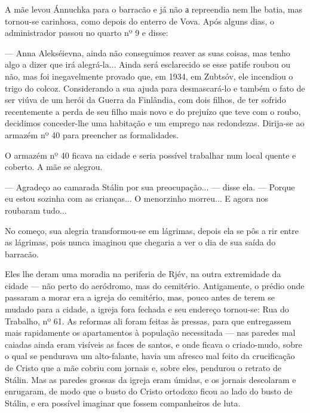 A mãe levou Ánnuchka para o barracão e já não а repreendia nem lhe
batia, mas tornou-se carinhosa, como depois do enterro de Vova. Após
alguns dias, o administrador passou no quarto nº 9 e disse:

--- Anna Alekséievna, ainda não conseguimos reaver as suas coisas, mas
tenho algo a dizer que irá alegrá-la... Ainda será esclarecido se esse
patife roubou ou não, mas foi inegavelmente provado que, em 1934, em
Zubtsóv, ele incendiou o trigo do colcoz. Considerando a sua ajuda para
desmascará-lo e também o fato de ser viúva de um herói da Guerra da
Finlândia, com dois filhos, de ter sofrido recentemente a perda de seu
filho mais novo e do prejuízo que teve com o roubo, decidimos
conceder-lhe uma habitação e um emprego nas redondezas. Dirija-se ao
armazém nº 40 para preencher as formalidades.

O armazém nº 40 ficava na cidade e seria possível trabalhar num local
quente e coberto. A mãe se alegrou.

--- Agradeço ao camarada Stálin por sua preocupação... --- disse ela.
--- Porque eu estou sozinha com as crianças... O menorzinho morreu... E
agora nos roubaram tudo...

No começo, sua alegria transformou-se em lágrimas, depois ela se pôs a
rir entre as lágrimas, pois nunca imaginou que chegaria a ver o dia de
sua saída do barracão.

Eles lhe deram uma moradia na periferia de Rjév, na outra extremidade da
cidade --- não perto do aeródromo, mas do cemitério. Antigamente, o
prédio onde passaram a morar era a igreja do cemitério, mas, pouco antes
de terem se mudado para a cidade, a igreja fora fechada e seu endereço
tornou-se: Rua do Trabalho, nº 61. As reformas ali foram feitas às
pressas, para que entregassem mais rapidamente os apartamentos à
população necessitada --- nas paredes mal caiadas ainda eram visíveis as
faces de santos, e onde ficava o criado-mudo, sobre o qual se pendurava
um alto-falante, havia um afresco mal feito da crucificação de Cristo
que a mãe cobriu com jornais e, sobre eles, pendurou o retrato de
Stálin. Mas as paredes grossas da igreja eram úmidas, e os jornais
descolaram e enrugaram, de modo que o busto do Cristo ortodoxo ficou ao
lado do busto de Stálin, e era possível imaginar que fossem companheiros
de luta.

